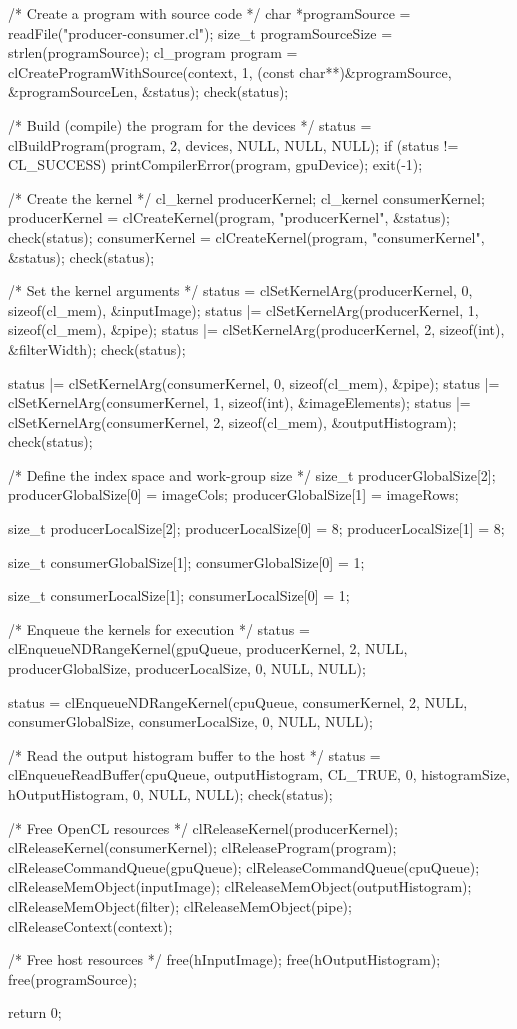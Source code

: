 \begin{codebox}[cpp]
{  /* Create a program with source code */
  char *programSource = readFile("producer-consumer.cl");
  size_t programSourceSize = strlen(programSource);
  cl_program program = clCreateProgramWithSource(context, 1, (const char**)&programSource, &programSourceLen, &status);
  check(status);

  /* Build (compile) the program for the devices */
  status = clBuildProgram(program, 2, devices, NULL, NULL, NULL);
  if (status != CL_SUCCESS)
  {
    printCompilerError(program, gpuDevice);
    exit(-1);
  }

  /* Create the kernel */
  cl_kernel producerKernel;
  cl_kernel consumerKernel;
  producerKernel = clCreateKernel(program, "producerKernel", &status);
  check(status);
  consumerKernel = clCreateKernel(program, "consumerKernel", &status);
  check(status);

  /* Set the kernel arguments */
  status = clSetKernelArg(producerKernel, 0, sizeof(cl_mem), &inputImage);
  status |= clSetKernelArg(producerKernel, 1, sizeof(cl_mem), &pipe);
  status |= clSetKernelArg(producerKernel, 2, sizeof(int), &filterWidth);
  check(status);

  status |= clSetKernelArg(consumerKernel, 0, sizeof(cl_mem), &pipe);
  status |= clSetKernelArg(consumerKernel, 1, sizeof(int), &imageElements);
  status |= clSetKernelArg(consumerKernel, 2, sizeof(cl_mem), &outputHistogram);
  check(status);

  /* Define the index space and work-group size */
  size_t producerGlobalSize[2];
  producerGlobalSize[0] = imageCols;
  producerGlobalSize[1] = imageRows;

  size_t producerLocalSize[2];
  producerLocalSize[0] = 8;
  producerLocalSize[1] = 8;

  size_t consumerGlobalSize[1];
  consumerGlobalSize[0] = 1;

  size_t consumerLocalSize[1];
  consumerLocalSize[0] = 1;

  /* Enqueue the kernels for execution */
  status  = clEnqueueNDRangeKernel(gpuQueue, producerKernel, 2, NULL, producerGlobalSize, producerLocalSize, 0, NULL, NULL);

  status = clEnqueueNDRangeKernel(cpuQueue, consumerKernel, 2, NULL, consumerGlobalSize, consumerLocalSize, 0, NULL, NULL);

  /* Read the output histogram buffer to the host */
  status = clEnqueueReadBuffer(cpuQueue, outputHistogram, CL_TRUE, 0, histogramSize, hOutputHistogram, 0, NULL, NULL);
  check(status);

  /* Free OpenCL resources */
  clReleaseKernel(producerKernel);
  clReleaseKernel(consumerKernel);
  clReleaseProgram(program);
  clReleaseCommandQueue(gpuQueue);
  clReleaseCommandQueue(cpuQueue);
  clReleaseMemObject(inputImage);
  clReleaseMemObject(outputHistogram);
  clReleaseMemObject(filter);
  clReleaseMemObject(pipe);
  clReleaseContext(context);

  /* Free host resources */
  free(hInputImage);
  free(hOutputHistogram);
  free(programSource);

  return 0;
}
\end{codebox}

